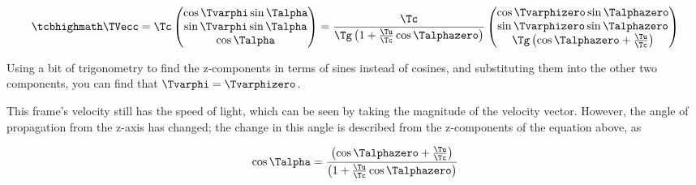 \begin{equation}
	\label{eq: velocity transform for light}
	\mhl{
		\TVecc  = \Tc
		\begin{pmatrix}
			\cos\Tvarphi \sin\Talpha  \\
			\sin\Tvarphi \sin\Talpha  \\
			\cos\Talpha             \\
		\end{pmatrix}
		=
		\dfrac{\Tc }{ {\Tg }\left(1+\frac{\Tu }{\Tc } \cos\Talphazero \right)}
		\begin{pmatrix}
			\cos\Tvarphizero \sin\Talphazero                         \\
			\sin\Tvarphizero \sin\Talphazero                         \\
			{\Tg } \left( \cos\Talphazero +\frac{\Tu }{\Tc } \right) \\
		\end{pmatrix}
	}
\end{equation}

Using a bit of trigonometry to find the z-components in terms of sines instead of cosines, and substituting them into the other two components, you can find that $\Tvarphi =\Tvarphizero $.



This frame's velocity still has the speed of light, which can be seen by taking the magnitude of the velocity vector.
However, the angle of propagation from the z-axis has changed; the change in this angle is described from the z-components of the equation above, as

\begin{equation}
	\label{eq: cosine transform}
	\cos\Talpha  = \dfrac{\left( \cos\Talphazero +\frac{\Tu }{\Tc } \right)}{\left(1+\frac{\Tu }{\Tc } \cos\Talphazero \right)}
\end{equation}

